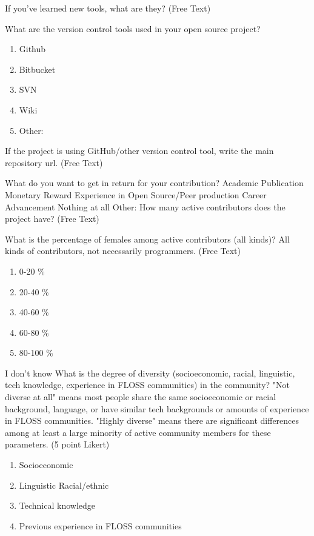 If you've learned new tools, what are they? (Free Text)

What are the version control tools used in your open source project?

\begin{enumerate}
\item Github
\item Bitbucket
\item SVN
\item Wiki
\item Other:
\end{enumerate}

If the project is using GitHub/other version control tool, write the main repository url. (Free Text)

What do you want to get in return for your contribution? Academic Publication Monetary Reward Experience in Open Source/Peer production Career Advancement Nothing at all Other: How many active contributors does the project have? (Free Text)

What is the percentage of females among active contributors (all kinds)? All kinds of contributors, not necessarily programmers. (Free Text)

\begin{enumerate}
\item  0-20 \%
\item 20-40 \%
\item 40-60 \%
\item 60-80 \%
\item 80-100 \%
\end{enumerate}

I don't know What is the degree of diversity (socioeconomic, racial, linguistic, tech knowledge, experience in FLOSS communities) in the community? "Not diverse at all" means most people share the same socioeconomic or racial background, language, or have similar tech backgrounds or amounts of experience in FLOSS communities. "Highly diverse" means there are significant differences among at least a large minority of active community members for these parameters. (5 point Likert)

\begin{enumerate}
\item Socioeconomic
\item Linguistic Racial/ethnic
\item Technical knowledge
\item Previous experience in FLOSS communities
\end{enumerate}

